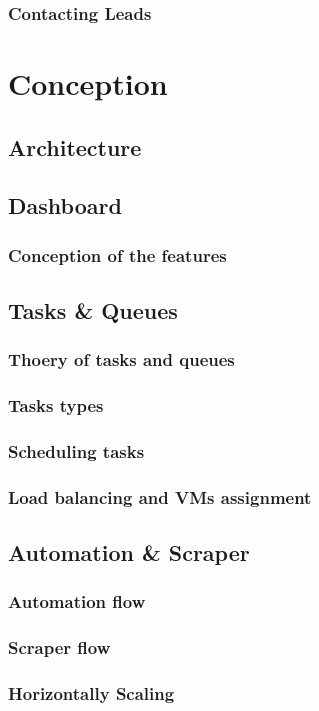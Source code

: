 \subsubsection{Contacting Leads}

\section{Conception}
\subsection{Architecture}
\subsection{Dashboard}
\subsubsection{Conception of the features}
\subsection{Tasks \& Queues}
\subsubsection{Thoery of tasks and queues}
\subsubsection{Tasks types}
\subsubsection{Scheduling tasks}
\subsubsection{Load balancing and VMs assignment }
\subsection{Automation \& Scraper}
\subsubsection{Automation flow}
\subsubsection{Scraper flow}
\subsubsection{Horizontally Scaling}
